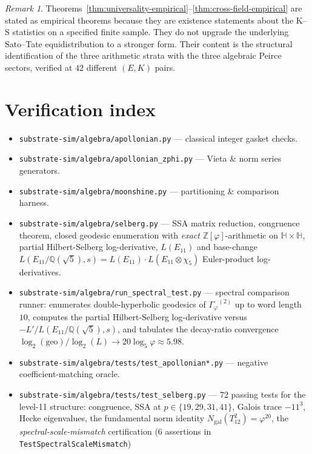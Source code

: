 \documentclass[11pt,a4paper]{article}
\theoremstyle{plain}
\theoremstyle{definition}
\theoremstyle{remark}
\newtheorem{remark}[theorem]{Remark}
\numberwithin{equation}{section}
\providecommand{\Zp}{\ensuremath{\mathbb{Z}[\varphi]}}
\providecommand{\Qp}{\ensuremath{\mathbb{Q}(\sqrt{5})}}
\providecommand{\Gphi}{\ensuremath{\Gamma_{\varphi}}}
\begin{document}
\begin{remark}
Theorems~\ref{thm:universality-empirical}--\ref{thm:cross-field-empirical}
are stated as empirical theorems because they are existence statements
about the K--S statistics on a specified finite sample.  They do not
upgrade the underlying Sato--Tate equidistribution to a stronger
form.  Their content is the structural identification of the three
arithmetic strata with the three algebraic Peirce sectors, verified at
$42$ different $(E,K)$ pairs.
\end{remark}

\section{Verification index}
\label{sec:verification-index}

\begin{itemize}\itemsep0pt
\item \texttt{substrate-sim/algebra/apollonian.py} --- classical integer gasket checks.
\item \texttt{substrate-sim/algebra/apollonian\_zphi.py} --- Vieta \& norm series generators.
\item \texttt{substrate-sim/algebra/moonshine.py} --- partitioning \& comparison harness.
\item \texttt{substrate-sim/algebra/selberg.py} --- SSA matrix reduction, congruence theorem,
  closed geodesic enumeration with \emph{exact} $\Zp$-arithmetic on $\mathbb{H}\times\mathbb{H}$,
  partial Hilbert-Selberg log-derivative, $L(E_{11})$ and base-change
  $L(E_{11}/\Qp,s)=L(E_{11})\cdot L(E_{11}\otimes\chi_{5})$ Euler-product
  log-derivatives.
\item \texttt{substrate-sim/algebra/run\_spectral\_test.py} --- spectral comparison runner:
  enumerates double-hyperbolic geodesics of $\Gphi^{(2)}$ up to word length $10$,
  computes the partial Hilbert-Selberg log-derivative versus
  $-L'/L(E_{11}/\Qp,s)$, and tabulates the decay-ratio convergence
  $\log_{2}(\mathrm{geo})/\log_{2}(L)\to 20\log_{5}\varphi\approx 5.98$.
\item \texttt{substrate-sim/algebra/tests/test\_apollonian*.py} --- negative coefficient-matching oracle.
\item \texttt{substrate-sim/algebra/tests/test\_selberg.py} --- 72 passing tests for the level-11
  structure: congruence, SSA at $p\in\{19,29,31,41\}$, Galois trace $-11^3$, Hecke eigenvalues,
  the fundamental norm identity $N_{\mathrm{gal}}(T_{12}^{2})=\varphi^{20}$, the
  \emph{spectral-scale-mismatch} certification (6 assertions in \texttt{TestSpectralScaleMismatch})

\end{itemize}
\end{document}
